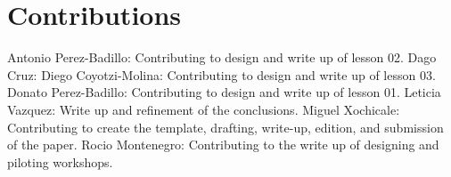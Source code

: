 \documentclass[conference]{IEEEtran}
\begin{document}
\section*{Contributions}
Antonio Perez-Badillo: Contributing to design and write up of lesson 02.
Dago Cruz:
Diego Coyotzi-Molina: Contributing to design and write up of lesson 03.
Donato Perez-Badillo: Contributing to design and write up of lesson 01.
Leticia Vazquez: Write up and refinement of the conclusions.
Miguel Xochicale: Contributing to create the template, drafting, write-up, edition, and submission of the paper. 
Rocio Montenegro: Contributing to the write up of designing and piloting workshops. 


\end{document}
